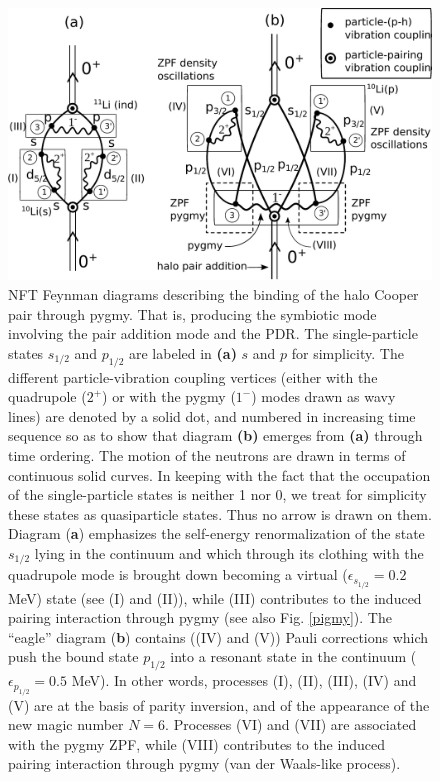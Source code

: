    \begin{figure}
   \centerline{\includegraphics*[width=17cm,angle=0]{nutshell/figs/VdW.pdf}}\caption{NFT Feynman diagrams describing the binding of the halo Cooper pair through pygmy. That is, producing the symbiotic mode involving the pair addition mode and the PDR. The single-particle states $s_{1/2}$ and $p_{1/2}$ are labeled in \textbf{(a)} $s$ and $p$ for simplicity. The different particle-vibration coupling vertices (either with the quadrupole ($2^+$) or with the pygmy ($1^-$) modes drawn as  wavy lines) are denoted by a solid dot, and numbered in increasing time sequence so as to show that diagram \textbf{(b)} emerges from \textbf{(a)} through time ordering. The motion of the neutrons are drawn in terms of continuous solid curves. In keeping with the fact that the occupation of the single-particle states is neither 1 nor 0, we treat for simplicity these states  as quasiparticle states. Thus no arrow is drawn on them. Diagram (\textbf{a}) emphasizes the self-energy renormalization of the state $s_{1/2}$ lying in the continuum and which   through its clothing with the quadrupole mode is brought down becoming a virtual ($\epsilon_{s_{1/2}}=0.2$ MeV) state (see (I) and (II)), while (III) contributes to the induced pairing interaction through pygmy (see also Fig. \ref{pigmy}). The ``eagle'' diagram (\textbf{b}) contains ((IV) and (V)) Pauli corrections which push the bound state $p_{1/2}$ into a resonant state in the continuum ($\epsilon_{p_{1/2}}=0.5$ MeV). In other words, processes (I), (II), (III), (IV) and (V) are at the basis of parity inversion, and of the appearance of the new magic number $N=6$. Processes (VI) and (VII) are associated with the pygmy ZPF, while (VIII) contributes to the induced pairing interaction through pygmy (van der Waals-like process).}\label{fig2.A.1}
   \end{figure}

